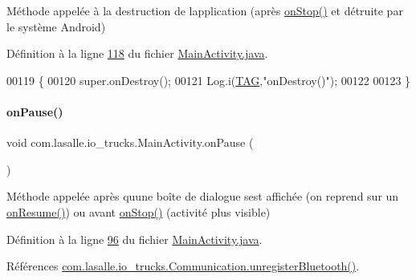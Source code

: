 Méthode appelée à la destruction de l\textquotesingle{}application (après \hyperlink{classcom_1_1lasalle_1_1io__trucks_1_1_main_activity_a6fbad98934d4b04260faff49da3d52ad}{on\+Stop()} et détruite par le système Android) 



Définition à la ligne \hyperlink{_main_activity_8java_source_l00118}{118} du fichier \hyperlink{_main_activity_8java_source}{Main\+Activity.\+java}.


\begin{DoxyCode}
00119     \{
00120         super.onDestroy();
00121         Log.i(\hyperlink{classcom_1_1lasalle_1_1io__trucks_1_1_main_activity_a37b90dba972711328e3f4c83c55eb0fc}{TAG},\textcolor{stringliteral}{"onDestroy()"});
00122 
00123     \}
\end{DoxyCode}
\mbox{\label{classcom_1_1lasalle_1_1io__trucks_1_1_main_activity_a3d9481fd69693e777afbbfba5ddb0132}} 
\paragraph{\texorpdfstring{on\+Pause()}{onPause()}}
{\footnotesize\ttfamily void com.\+lasalle.\+io\+\_\+trucks.\+Main\+Activity.\+on\+Pause (\begin{DoxyParamCaption}{ }\end{DoxyParamCaption})\hspace{0.3cm}{\ttfamily [protected]}}



Méthode appelée après qu\textquotesingle{}une boîte de dialogue s\textquotesingle{}est affichée (on reprend sur un \hyperlink{classcom_1_1lasalle_1_1io__trucks_1_1_main_activity_adc08807b3af20598d330f394acf55ecb}{on\+Resume()}) ou avant \hyperlink{classcom_1_1lasalle_1_1io__trucks_1_1_main_activity_a6fbad98934d4b04260faff49da3d52ad}{on\+Stop()} (activité plus visible) 



Définition à la ligne \hyperlink{_main_activity_8java_source_l00096}{96} du fichier \hyperlink{_main_activity_8java_source}{Main\+Activity.\+java}.



Références \hyperlink{_communication_8java_source_l00141}{com.\+lasalle.\+io\+\_\+trucks.\+Communication.\+unregister\+Bluetooth()}.


